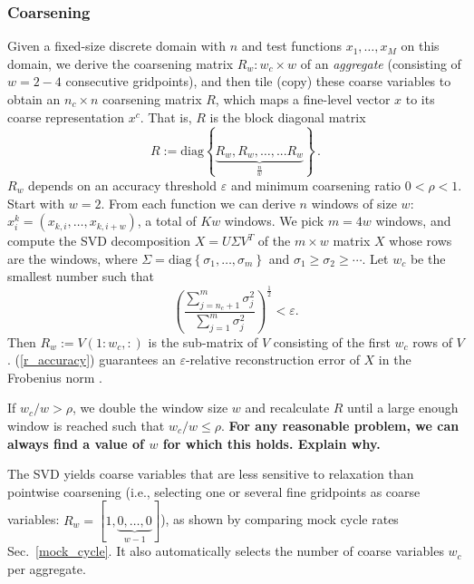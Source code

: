 \documentclass{article}
\begin{document}
\subsubsection{Coarsening}
Given a fixed-size discrete domain with $n$ and test functions $x_1,\dots,x_M$ on this domain, we derive the coarsening matrix $R_w: w_c \times w$ of an \emph{aggregate} (consisting of $w = 2-4$ consecutive gridpoints), and then tile (copy) these coarse variables to obtain an $n_c \times n$ coarsening matrix $R$, which maps a fine-level vector $x$ to its coarse representation $x^c$. That is, $R$ is the block diagonal matrix
\begin{equation}
	R := \text{diag} \left\{ \underbrace{R_w, R_w, \dots, ... R_w }_{\frac{n}{w}}  \right\} \,.
\end{equation}
$R_w$ depends on an accuracy threshold $\varepsilon$ and minimum coarsening ratio $0 < \rho < 1$. Start with $w = 2$. From each function we can derive $n$ windows of size $w$: $x^k_i = (x_{k,i},\dots,x_{k,i+w})$, a total of $Kw$ windows. We pick $m = 4 w$ windows, and compute the SVD decomposition $X = U \Sigma V^T$ of the $m \times w$ matrix $X$ whose rows are the windows, where $\Sigma = \text{diag}\left\{\sigma_1, \dots, \sigma_m \right\}$ and $\sigma_1 \geq \sigma_2 \geq \cdots$. Let $w_c$ be the smallest number such that
\begin{equation}
	\left(\frac{\sum_{j=n_c+1}^m \sigma_j^2}{\sum_{j=1}^m \sigma_j^2 } \right)^{\frac12} < \varepsilon.
	\label{r_accuracy}
\end{equation}
Then $R_w := V(1:w_c,:)$ is the sub-matrix of $V$ consisting of the first $w_c$ rows of $V$. (\ref{r_accuracy}) guarantees an $\varepsilon$-relative reconstruction error of $X$ in the Frobenius norm \cite{svd}.

If $w_c/w > \rho$, we double the window size $w$ and recalculate $R$ until a large enough window is reached such that $w_c/w \leq \rho$. \textbf{For any reasonable problem, we can always find a value of $w$ for which this holds. Explain why.}


The SVD yields coarse variables that are less sensitive to relaxation than pointwise coarsening (i.e., selecting one or several fine gridpoints as coarse variables: $R_w = [1,\underbrace{0,\dots,0}_{w-1}]$), as shown by comparing mock cycle rates Sec.~\ref{mock_cycle}. It also automatically selects the number of coarse variables $w_c$ per aggregate.
\end{document}
